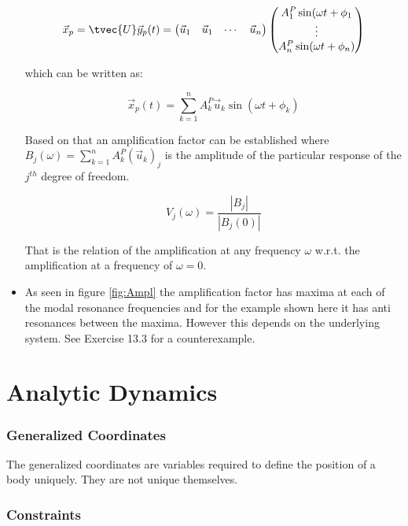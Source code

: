 \documentclass[10pt,a4paper]{scrartcl}
\begin{document}
\begin{multicols*}{2}
\begin{itemize}
\begin{equation*}
\vec{x}_p = \tvec{U}\vec{y}_p(t) = \begin{pmatrix}\vec{u}_1&\vec{u}_1&\cdots&\vec{u}_n\end{pmatrix}\begin{pmatrix}
A_1^P\sin(\omega t+\phi_1\\\vdots\\ A_n^P\sin(\omega t+\phi_n)
\end{pmatrix}
\end{equation*} 

which can be written as:

\begin{equation*}
\vec{x}_p(t)=\sum\limits_{k=1}^n A_k^P\vec{u}_k\sin(\omega t+\phi_k)
\end{equation*}

Based on that an amplification factor can be established where $B_j(\omega) =\sum\limits_{k=1}^n A_k^P(\vec{u}_k)_j$ is the amplitude of the particular response of the $j^{th}$ degree of freedom.

\begin{equation*}
V_j(\omega) = \frac{|B_j|}{|B_j(0)|}
\end{equation*}

That is the relation of the amplification at any frequency $\omega$ w.r.t. the amplification at a frequency of $\omega = 0$.


\item As seen in figure \ref{fig:Ampl} the amplification factor has maxima at each of the modal resonance frequencies and for the example shown here it has anti resonances between the maxima. However this depends on the underlying system. See Exercise 13.3 for a counterexample.

\end{itemize}

\section{Analytic Dynamics}
\subsubsection{Generalized Coordinates}
The generalized coordinates are variables required to define the position of a body uniquely. They are not unique themselves.
\subsubsection{Constraints}


\end{multicols*}
\end{document}
